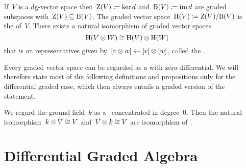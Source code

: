 \documentclass[a4paper,10pt,headings=standardclasses]{scrartcl}
\begin{document}
If~$V$ is a dg-vector space then~$\operatorname{Z}(V) \coloneqq \ker d$ and~$\operatorname{B}(V) \coloneqq \operatorname{im} d$ are graded subspaces with~$\operatorname{Z}(V) \subseteq \operatorname{B}(V)$.
The graded vector space~$\operatorname{H}(V) \coloneqq \operatorname{Z}(V)/{\operatorname{B}(V)}$ is the  of~$V$.
There exists a natural isomorphism of graded vector spaces
\[
  \operatorname{H}(V \otimes W)
  \cong
  \operatorname{H}(V) \otimes \operatorname{H}(W)
\]
that is on representatives given by~$[v \otimes w] \mapsfrom [v] \otimes [w]$, called the .

\begin{remark}
  Every graded vector space can be regarded as a {\dgv} with zero differential.
  We will therefore state most of the following definitions and propositions only for the differential graded case, which then always entails a graded version of the statement.
\end{remark}

We regard the ground field~$k$ as a~{\dgv} concentrated in degree~$0$.
Then the natural isomorphism~$k \otimes V \cong V$ and~$V \otimes k \cong V$ are isomorphism of~{\dgv}.





\section{Differential Graded Algebra}
\end{document}
